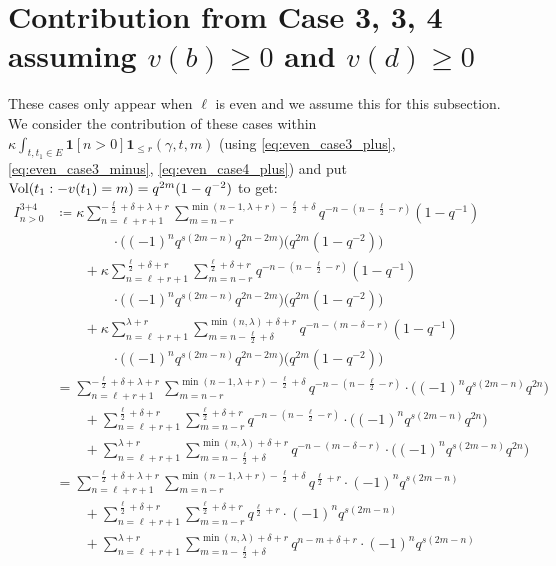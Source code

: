 \section{Contribution from Case 3\ts{+}, 3\ts{-}, 4\ts{+} assuming $v(b) \ge 0$ and $v(d) \ge 0$}
These cases only appear when $\ell$ is even and we assume this for this subsection.
We consider the contribution of these cases within
$\kappa \int_{t, t_1 \in E} \mathbf{1}[n > 0] \mathbf{1}_{\le r}(\gamma,t,m)$
(using \eqref{eq:even_case3_plus}, \eqref{eq:even_case3_minus}, \eqref{eq:even_case4_plus})
and put $\operatorname{Vol}(t_1:-v(t_1)=m) = q^{2m} (1-q^{-2})$ to get:
\begin{align*}
  I_{n > 0}^{\text{3+4}}
  &\coloneqq \kappa \sum_{n=\ell+r+1}^{-\frac{\ell}{2}+\delta+\lambda+r}
    \sum_{m=n-r}^{\min(n-1, \lambda+r)-\frac{\ell}{2}+\delta}
    q^{-n-(n-\frac{\ell}{2}-r)} \left( 1 - q^{-1} \right) \\
    &\qquad\qquad\cdot \Big( (-1)^n q^{s(2m-n)} q^{2n-2m} \Big) \Big( q^{2m}(1-q^{-2}) \Big) \\
  &\qquad+ \kappa \sum_{n=\ell+r+1}^{\frac{\ell}{2}+\delta+r}
    \sum_{m=n-r}^{\frac{\ell}{2}+\delta+r}
    q^{-n-(n-\frac{\ell}{2}-r)} \left( 1 - q^{-1} \right) \\
  &\qquad\qquad\cdot \Big( (-1)^n q^{s(2m-n)} q^{2n-2m} \Big) \Big( q^{2m}(1-q^{-2}) \Big) \\
  &\qquad+ \kappa \sum_{n=\ell+r+1}^{\lambda+r}
    \sum_{m=n-\frac{\ell}{2}+\delta}^{\min(n,\lambda)+\delta+r}
    q^{-n-(m-\delta-r)} \left( 1 - q^{-1} \right) \\
    &\qquad\qquad\cdot \Big( (-1)^n q^{s(2m-n)} q^{2n-2m} \Big) \Big( q^{2m}(1-q^{-2}) \Big) \\
  &= \sum_{n=\ell+r+1}^{-\frac{\ell}{2}+\delta+\lambda+r}
    \sum_{m=n-r}^{\min(n-1, \lambda+r)-\frac{\ell}{2}+\delta}
    q^{-n-(n-\frac{\ell}{2}-r)}
      \cdot \Big( (-1)^n q^{s(2m-n)} q^{2n} \Big) \\
  &\qquad+ \sum_{n=\ell+r+1}^{\frac{\ell}{2}+\delta+r}
    \sum_{m=n-r}^{\frac{\ell}{2}+\delta+r}
    q^{-n-(n-\frac{\ell}{2}-r)}
      \cdot \Big( (-1)^n q^{s(2m-n)} q^{2n} \Big) \\
  &\qquad+ \sum_{n=\ell+r+1}^{\lambda+r}
    \sum_{m=n-\frac{\ell}{2}+\delta}^{\min(n,\lambda)+\delta+r}
    q^{-n-(m-\delta-r)}
      \cdot \Big( (-1)^n q^{s(2m-n)} q^{2n} \Big) \\
  &= \sum_{n=\ell+r+1}^{-\frac{\ell}{2}+\delta+\lambda+r}
    \sum_{m=n-r}^{\min(n-1, \lambda+r)-\frac{\ell}{2}+\delta}
    q^{\frac{\ell}{2}+r} \cdot (-1)^n q^{s(2m-n)} \\
  &\qquad+ \sum_{n=\ell+r+1}^{\frac{\ell}{2}+\delta+r}
    \sum_{m=n-r}^{\frac{\ell}{2}+\delta+r}
    q^{\frac{\ell}{2}+r} \cdot (-1)^n q^{s(2m-n)} \\
  &\qquad+ \sum_{n=\ell+r+1}^{\lambda+r}
    \sum_{m=n-\frac{\ell}{2}+\delta}^{\min(n,\lambda)+\delta+r}
    q^{n-m+\delta+r} \cdot (-1)^n q^{s(2m-n)} \\
\end{align*}

